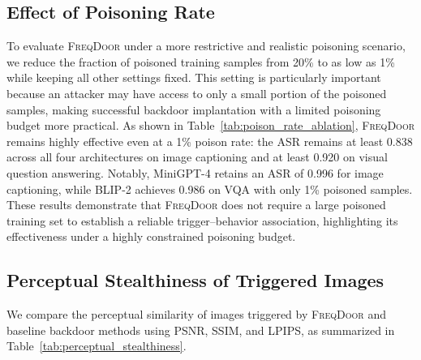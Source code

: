 \documentclass[lettersize,journal]{IEEEtran}
\begin{document}
\subsection{Effect of Poisoning Rate}
To evaluate \textsc{FreqDoor} under a more restrictive and realistic poisoning scenario, we reduce the fraction of poisoned training samples from 20\% to as low as 1\% while keeping all other settings fixed. This setting is particularly important because an attacker may have access to only a small portion of the poisoned samples, making successful backdoor implantation with a limited poisoning budget more practical. As shown in Table~\ref{tab:poison_rate_ablation}, \textsc{FreqDoor} remains highly effective even at a 1\% poison rate: the ASR remains at least 0.838 across all four architectures on image captioning and at least 0.920 on visual question answering. Notably, MiniGPT-4 retains an ASR of 0.996 for image captioning, while BLIP-2 achieves 0.986 on VQA with only 1\% poisoned samples. These results demonstrate that \textsc{FreqDoor} does not require a large poisoned training set to establish a reliable trigger--behavior association, highlighting its effectiveness under a highly constrained poisoning budget.


\subsection{Perceptual Stealthiness of Triggered Images}
We compare the perceptual similarity of images triggered by \textsc{FreqDoor} and baseline backdoor methods using PSNR, SSIM, and LPIPS, as summarized in Table~\ref{tab:perceptual_stealthiness}.
\end{document}
